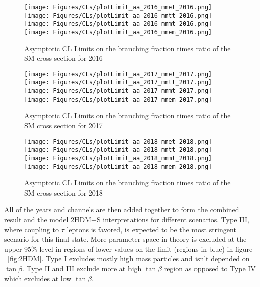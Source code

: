 \begin{figure}[ht!b]
  \centering
  \texttt{[image: Figures/CLs/plotLimit\_aa\_2016\_mmet\_2016.png]}
  \texttt{[image: Figures/CLs/plotLimit\_aa\_2016\_mmtt\_2016.png]}\\
  \texttt{[image: Figures/CLs/plotLimit\_aa\_2016\_mmmt\_2016.png]}
  \texttt{[image: Figures/CLs/plotLimit\_aa\_2016\_mmem\_2016.png]}\\
    \caption{\label{fig:CLs2016} Asymptotic CL Limits on the branching fraction times ratio of the SM cross section for 2016}
\end{figure}

\begin{figure}[ht!b]
  \centering
  \texttt{[image: Figures/CLs/plotLimit\_aa\_2017\_mmet\_2017.png]}
  \texttt{[image: Figures/CLs/plotLimit\_aa\_2017\_mmtt\_2017.png]}\\
  \texttt{[image: Figures/CLs/plotLimit\_aa\_2017\_mmmt\_2017.png]}
  \texttt{[image: Figures/CLs/plotLimit\_aa\_2017\_mmem\_2017.png]}\\
    \caption{\label{fig:CLs2017} Asymptotic CL Limits on the branching fraction times ratio of the SM cross section for 2017}
\end{figure}

\begin{figure}[ht!b]
  \centering
  \texttt{[image: Figures/CLs/plotLimit\_aa\_2018\_mmet\_2018.png]}
  \texttt{[image: Figures/CLs/plotLimit\_aa\_2018\_mmtt\_2018.png]}\\
  \texttt{[image: Figures/CLs/plotLimit\_aa\_2018\_mmmt\_2018.png]}
  \texttt{[image: Figures/CLs/plotLimit\_aa\_2018\_mmem\_2018.png]}\\
    \caption{\label{fig:CLs2018} Asymptotic CL Limits on the branching fraction times ratio of the SM cross section for 2018}
\end{figure}

\clearpage

All of the years and channels are then added together to form the combined result and the model 2HDM+S interpretations for different scenarios. Type III, where coupling to $\tau$ leptons is favored, is expected to be the most stringent scenario for this final state. More parameter space in theory is excluded at the upper 95\% level in regions of lower values on the limit (regions in blue) in figure ~\ref{fig:2HDM}. Type I excludes mostly high mass particles and isn't depended on $\tan\beta$. Type II and III exclude more at high $\tan\beta$ region as opposed to Type IV which excludes at low $\tan\beta$.


